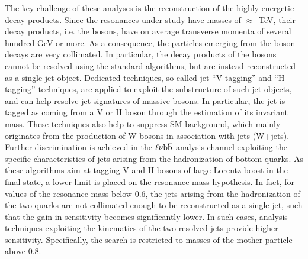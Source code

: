 The key challenge of these analyses is the reconstruction of the highly energetic decay products.
Since the resonances under study have masses of $\approx$~TeV, their decay products, i.e. the bosons,
have on average transverse momenta of several hundred GeV or more.
As a consequence, the particles emerging from the boson decays are very collimated.
In particular, the decay products of the bosons cannot be resolved using the standard algorithms,
but are instead reconstructed as a single jet object. Dedicated techniques, so-called jet ``V-tagging'' and ``H-tagging'' techniques,
are applied to exploit the substructure of such jet objects, and can help resolve jet signatures of massive bosons.
In particular, the jet is tagged as coming from a V or H boson through the estimation of its invariant mass.
These techniques also help to suppress SM background, which mainly originates from the production of W bosons in association with jets (W+jets).
Further discrimination is achieved in the $\ell\nu{\mathrm{b}\overline{\mathrm{b}}}$ analysis channel exploiting the specific characteristics of jets arising from the hadronization of bottom quarks.
As these algorithms aim at tagging V and H bosons of large Lorentz-boost in the final state, a lower limit is placed on the resonance mass hypothesis.
In fact, for values of the resonance mass below 0.6\TeV, the jets arising from the hadronization of the two quarks are not collimated enough to be reconstructed as a single jet,
such that the gain in sensitivity becomes significantly lower. In such cases, analysis techniques exploiting the kinematics of the two resolved jets provide higher sensitivity.
Specifically, the  search is restricted to masses of the mother particle above 0.8\TeV.

